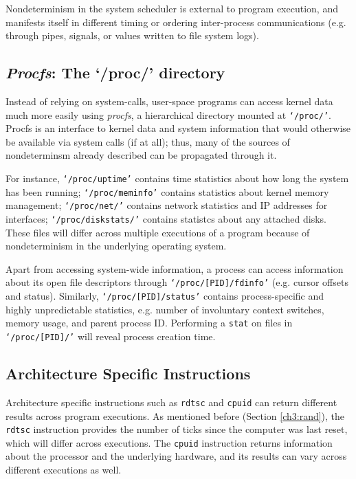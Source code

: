 Nondeterminism in the system
scheduler is external to 
program execution, and manifests itself
in different timing or ordering
inter-process communications (e.g.
through pipes, signals, or 
values written to file system logs).

\subsection{{\em Procfs}: The `/proc/' directory}\label{ch3:procfs}
Instead of relying on system-calls, user-space programs
can access kernel data much more easily using {\em procfs}, a hierarchical 
directory mounted at \texttt{`/proc/'}.
Procfs is an interface
to kernel data and system information
that would otherwise be available
via system calls (if at all);
thus, many of the sources of nondeterminsm
already described can be propagated
through it.

For instance, \texttt{`/proc/uptime'} contains time statistics about how
long the system has been running;
\texttt{`/proc/meminfo'} contains statistics about kernel memory management;
\texttt{`/proc/net/'} contains network statistics and IP addresses for interfaces;
\texttt{`/proc/diskstats/'} contains statistcs about any attached disks.
These files will differ across multiple executions
of a program because of nondeterminism in the underlying operating system. 

Apart from accessing system-wide information, a process can access 
information about its open file descriptors through
\texttt{`/proc/[PID]/fdinfo'} (e.g. cursor offsets and status).
Similarly, \texttt{`/proc/[PID]/status'} contains
process-specific and highly unpredictable statistics,
e.g. number of involuntary context switches,
memory usage, and parent process ID.
Performing a \texttt{stat} on files in \texttt{`/proc/[PID]/'}
will reveal process creation time.

\subsection{Architecture Specific Instructions}
Architecture specific instructions such as \texttt{rdtsc}
and \texttt{cpuid} can return different
results across program executions. As mentioned before
(Section \ref{ch3:rand}), the \texttt{rdtsc} instruction provides the number of ticks since
the computer was last reset, which
will differ across executions. The \texttt{cpuid} instruction
returns information about the processor and the underlying 
hardware, and its results can vary across different
executions as well.

